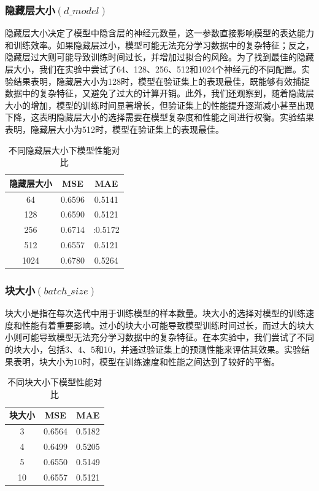 \documentclass[12pt]{article}
\begin{document}
\subsubsection*{隐藏层大小$(d\_model)$}
隐藏层大小决定了模型中隐含层的神经元数量，这一参数直接影响模型的表达能力和训练效率。如果隐藏层过小，模型可能无法充分学习数据中的复杂特征；反之，隐藏层过大则可能导致训练时间过长，并增加过拟合的风险。为了找到最佳的隐藏层大小，我们在实验中尝试了64、128、256、512和1024个神经元的不同配置。实验结果表明，隐藏层大小为128时，模型在验证集上的表现最佳，既能够有效捕捉数据中的复杂特征，又避免了过大的计算开销。此外，我们还观察到，随着隐藏层大小的增加，模型的训练时间显著增长，但验证集上的性能提升逐渐减小甚至出现下降，这表明隐藏层大小的选择需要在模型复杂度和性能之间进行权衡。实验结果表明，隐藏层大小为512时，模型在验证集上的表现最佳。
\begin{table}[H]
    \centering
    \caption{不同隐藏层大小下模型性能对比}
    \label{tab:hidden_size}
    \begin{tabular}{|c|c|c|}
        \hline
        \textbf{隐藏层大小} & \textbf{MSE} & \textbf{MAE} \\
        \hline
        64 & 0.6596 & 0.5141 \\
        \hline
        128 & 0.6590 & 0.5121 \\
        \hline
        256 & 0.6714 & :0.5172 \\
        \hline
        512 & 0.6557 & 0.5121 \\
        \hline
        1024 & 0.6780 & 0.5264 \\
        \hline
    \end{tabular}
\end{table}

\subsubsection*{块大小$(batch\_size)$}
块大小是指在每次迭代中用于训练模型的样本数量。块大小的选择对模型的训练速度和性能有着重要影响。过小的块大小可能导致模型训练时间过长，而过大的块大小则可能导致模型无法充分学习数据中的复杂特征。在本实验中，我们尝试了不同的块大小，包括3、4、5和10，并通过验证集上的预测性能来评估其效果。实验结果表明，块大小为10时，模型在训练速度和性能之间达到了较好的平衡。
\begin{table}[H]
    \centering
    \caption{不同块大小下模型性能对比}
    \label{tab:batch_size}
    \begin{tabular}{|c|c|c|}
        \hline
        \textbf{块大小} & \textbf{MSE} & \textbf{MAE} \\
        \hline
        3 & 0.6564 & 0.5182 \\
        \hline
        4 & 0.6499 & 0.5205 \\
        \hline
        5 & 0.6550 & 0.5149 \\
        \hline
        10 & 0.6557 & 0.5121 \\
        \hline
    \end{tabular}
\end{table}
\end{document}
